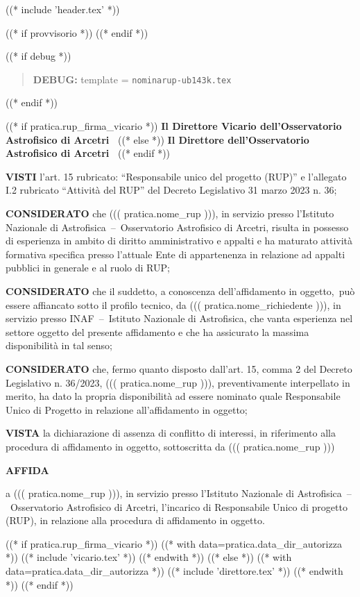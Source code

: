 
((* include 'header.tex' *))

((* if provvisorio *))
((* endif *))


\topaddr
((* if debug *))
\begin{quotation}
	\textbf{DEBUG:} template = \texttt{nominarup-ub143k.tex}
\end{quotation}
((* endif *))

\begin{center}
((* if pratica.rup_firma_vicario *))
\textbf{Il Direttore Vicario dell’Osservatorio Astrofisico di Arcetri }
((* else *))
\textbf{Il Direttore dell’Osservatorio Astrofisico di Arcetri }
((* endif *))
\end{center}

\textbf{VISTI}	l’art. 15 rubricato: ``Responsabile unico del progetto (RUP)'' e l’allegato I.2 rubricato
``Attività del RUP'' del Decreto Legislativo 31 marzo 2023 n. 36;

\textbf{CONSIDERATO} 	che ((( pratica.nome_rup ))), in servizio presso l’Istituto Nazionale di
Astrofisica~–~Osservatorio Astrofisico di Arcetri, risulta in possesso di esperienza in ambito di diritto
amministrativo e appalti e ha maturato attività formativa specifica presso l’attuale Ente di appartenenza
in relazione ad appalti pubblici in generale e al ruolo di RUP;

\textbf{CONSIDERATO} che il suddetto, a conoscenza dell’affidamento in oggetto, può essere affiancato sotto il
profilo tecnico, da ((( pratica.nome_richiedente ))), in servizio presso INAF~–~Istituto Nazionale di
Astrofisica, che vanta esperienza nel settore oggetto del presente affidamento e che ha assicurato la
massima disponibilità in tal senso;

\textbf{CONSIDERATO} 	che, fermo quanto disposto dall’art. 15, comma 2 del Decreto Legislativo n. 36/2023,
((( pratica.nome_rup ))), preventivamente interpellato in merito, ha dato la propria disponibilità ad
essere nominato quale Responsabile Unico di Progetto in relazione all’affidamento in oggetto;

\textbf{VISTA}	la dichiarazione di assenza di conflitto di interessi, in riferimento alla procedura di affidamento
in oggetto, sottoscritta da ((( pratica.nome_rup )))

\begin{center}
	\textbf{AFFIDA}
\end{center}

a ((( pratica.nome_rup ))), in servizio presso l’Istituto Nazionale di Astrofisica~–~Osservatorio
Astrofisico di Arcetri, l’incarico di Responsabile Unico di progetto (RUP), in relazione alla procedura
di affidamento in oggetto.

((* if pratica.rup_firma_vicario *))
((* with data=pratica.data_dir_autorizza *))
((* include 'vicario.tex' *))
((* endwith *))
((* else *))
((* with data=pratica.data_dir_autorizza *))
((* include 'direttore.tex' *))
((* endwith *))
((* endif *))

